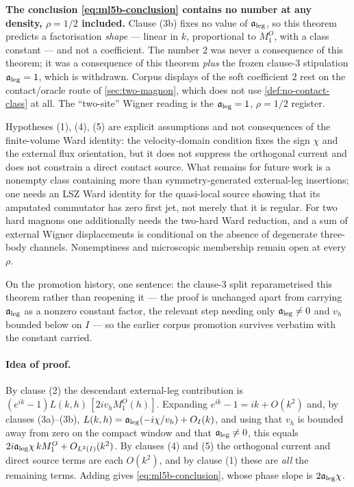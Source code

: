 \begin{scope}
\label{scope:ml5-b}
\textbf{The conclusion \cref{eq:ml5b-conclusion} contains no number at any
density, $\rho=1/2$ included.} Clause (3b) fixes no value of $\mathfrak{a}_{\mathrm{leg}}$, so this
theorem predicts a factorisation \emph{shape} --- linear in $k$, proportional
to $M_1^O$, with a class constant --- and not a coefficient. The number $2$ was
never a consequence of this theorem; it was a consequence of this theorem
\emph{plus} the frozen clause-3 stipulation $\mathfrak{a}_{\mathrm{leg}}=1$, which is withdrawn.
Corpus displays of the soft coefficient $2$ rest on the contact/oracle route
of \cref{sec:two-magnon}, which does not use \cref{def:no-contact-class} at
all. The ``two-site'' Wigner reading is the $\mathfrak{a}_{\mathrm{leg}}=1$, $\rho=1/2$ register.

Hypotheses (1), (4), (5) are explicit assumptions and not consequences of the
finite-volume Ward identity: the velocity-domain condition fixes the sign
$\chi$ and the external flux orientation, but it does not suppress the
orthogonal current and does not constrain a direct contact source. What
remains for future work is a nonempty class containing more than
symmetry-generated external-leg insertions; one needs an LSZ Ward identity for
the quasi-local source showing that its amputated commutator has zero first
jet, not merely that it is regular. For two hard magnons one additionally
needs the two-hard Ward reduction, and a sum of external Wigner displacements
is conditional on the absence of degenerate three-body channels. Nonemptiness
and microscopic membership remain open at every $\rho$.

On the promotion history, one sentence: the clause-3 split reparametrised this
theorem rather than reopening it --- the proof is unchanged apart from carrying
$\mathfrak{a}_{\mathrm{leg}}$ as a nonzero constant factor, the relevant step needing only
$\mathfrak{a}_{\mathrm{leg}}\neq0$ and $v_h$ bounded below on $I$ --- so the earlier corpus promotion
survives verbatim with the constant carried.
\end{scope}

\paragraph{Idea of proof.} By clause (2) the descendant external-leg
contribution is $(e^{ik}-1)L(k,h)\,[2iv_hM_1^O(h)]$. Expanding
$e^{ik}-1=ik+O(k^2)$ and, by clauses (3a)--(3b),
$L(k,h)=\mathfrak{a}_{\mathrm{leg}}(-i\chi/v_h)+O_I(k)$, and using that $v_h$ is bounded away from
zero on the compact window and that $\mathfrak{a}_{\mathrm{leg}}\neq0$, this equals
$2i\mathfrak{a}_{\mathrm{leg}}\chi\,kM_1^O+O_{L^2(I)}(k^2)$. By clauses (4) and (5) the orthogonal
current and direct source terms are each $O(k^2)$, and by clause (1) these are
\emph{all} the remaining terms. Adding gives \cref{eq:ml5b-conclusion}, whose
phase slope is $2\mathfrak{a}_{\mathrm{leg}}\chi$.


